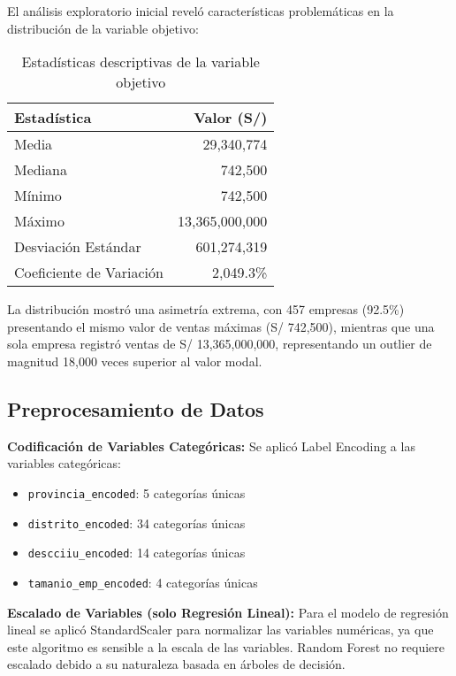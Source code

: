 \documentclass[12pt,a4paper]{article}
\begin{document}
El análisis exploratorio inicial reveló características problemáticas en la distribución de la variable objetivo:

\begin{table}[H]
\centering
\caption{Estadísticas descriptivas de la variable objetivo}
\begin{tabular}{lr}
\toprule
\textbf{Estadística} & \textbf{Valor (S/)} \\
\midrule
Media & 29,340,774 \\
Mediana & 742,500 \\
Mínimo & 742,500 \\
Máximo & 13,365,000,000 \\
Desviación Estándar & 601,274,319 \\
Coeficiente de Variación & 2,049.3\% \\
\bottomrule
\end{tabular}
\label{tab:estadisticas_descriptivas}
\end{table}

La distribución mostró una asimetría extrema, con 457 empresas (92.5\%) presentando el mismo valor de ventas máximas (S/ 742,500), mientras que una sola empresa registró ventas de S/ 13,365,000,000, representando un outlier de magnitud 18,000 veces superior al valor modal.

\subsection{Preprocesamiento de Datos}

\textbf{Codificación de Variables Categóricas:}
Se aplicó Label Encoding a las variables categóricas:
\begin{itemize}
    \item \texttt{provincia\_encoded}: 5 categorías únicas
    \item \texttt{distrito\_encoded}: 34 categorías únicas  
    \item \texttt{descciiu\_encoded}: 14 categorías únicas
    \item \texttt{tamanio\_emp\_encoded}: 4 categorías únicas
\end{itemize}

\textbf{Escalado de Variables (solo Regresión Lineal):}
Para el modelo de regresión lineal se aplicó StandardScaler para normalizar las variables numéricas, ya que este algoritmo es sensible a la escala de las variables. Random Forest no requiere escalado debido a su naturaleza basada en árboles de decisión.
\end{document}
